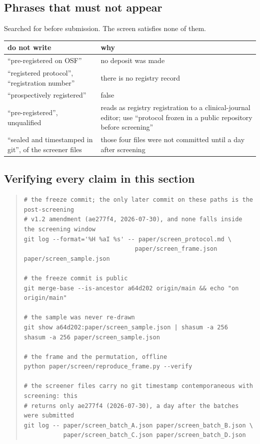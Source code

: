 \documentclass[11pt,a4paper]{article}
\begin{document}
\subsection{Phrases that must not appear}

Searched for before submission. The screen satisfies none of them.

\begin{table}[htbp]
\centering
\small
\begin{tabular}{@{}L{5.6cm}L{8.0cm}@{}}
\toprule
do not write & why \\
\midrule
``pre-registered on OSF'' & no deposit was made \\
``registered protocol'', ``registration number'' & there is no registry record \\
``prospectively registered'' & false \\
``pre-registered'', unqualified & reads as registry registration to a clinical-journal editor; use ``protocol frozen in a public repository before screening'' \\
``sealed and timestamped in git'', of the screener files & those four files were not committed until a day after screening \\
\bottomrule
\end{tabular}
\end{table}

\subsection{Verifying every claim in this section}

\begin{quote}\small
\begin{verbatim}
# the freeze commit; the only later commit on these paths is the post-screening
# v1.2 amendment (ae277f4, 2026-07-30), and none falls inside the screening window
git log --format='%H %aI %s' -- paper/screen_protocol.md \
                               paper/screen_frame.json paper/screen_sample.json

# the freeze commit is public
git merge-base --is-ancestor a64d202 origin/main && echo "on origin/main"

# the sample was never re-drawn
git show a64d202:paper/screen_sample.json | shasum -a 256
shasum -a 256 paper/screen_sample.json

# the frame and the permutation, offline
python paper/screen/reproduce_frame.py --verify

# the screener files carry no git timestamp contemporaneous with screening: this
# returns only ae277f4 (2026-07-30), a day after the batches were submitted
git log -- paper/screen_batch_A.json paper/screen_batch_B.json \
           paper/screen_batch_C.json paper/screen_batch_D.json
\end{verbatim}
\end{quote}
\end{document}
